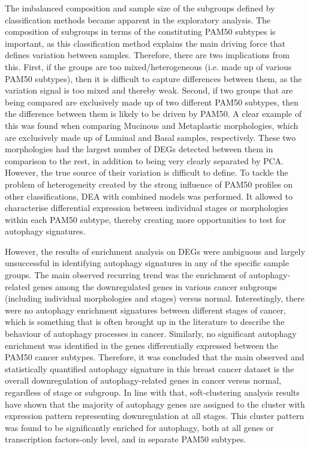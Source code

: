 The imbalanced composition and sample size of the subgroups defined by classification methods became apparent in the exploratory analysis. The composition of subgroups in terms of the constituting PAM50 subtypes is important, as this classification method explains the main driving force that defines variation between samples. Therefore, there are two implications from this. First, if the groups are too mixed/heterogeneous (i.e. made up of various PAM50 subtypes), then it is difficult to capture differences between them, as the variation signal is too mixed and thereby weak. Second, if two groups that are being compared are exclusively made up of two different PAM50 subtypes, then the difference between them is likely to be driven by PAM50. A clear example of this was found when comparing Mucinous and Metaplastic morphologies, which are exclusively made up of Luminal and Basal samples, respectively. These two morphologies had the largest number of DEGs detected between them in comparison to the rest, in addition to being very clearly separated by PCA. However,  the true source of their variation is difficult to define. 
To tackle the problem of heterogeneity created by the strong influence of PAM50 profiles on other classifications, DEA with combined models was performed. It allowed to characterise differential expression between individual stages or morphologies within each PAM50 subtype, thereby creating more opportunities to test for autophagy signatures.

However, the results of enrichment analysis on DEGs were ambiguous and largely unsuccessful in identifying autophagy signatures in any of the specific sample groups. The main observed recurring trend was the enrichment of autophagy-related genes among the downregulated genes in various cancer subgroups (including individual morphologies and stages) versus normal. Interestingly, there were no autophagy enrichment signatures between different stages of cancer, which is something that is often brought up in the literature to describe the behaviour of autophagy processes in cancer. Similarly, no significant autophagy enrichment was identified in the genes differentially expressed between the PAM50 cancer subtypes. Therefore, it was concluded that the main observed and statistically quantified autophagy signature in this breast cancer dataset is the overall downregulation of autophagy-related genes in cancer versus normal, regardless of stage or subgroup.
In line with that, soft-clustering analysis results have shown that the majority of autophagy genes are assigned to the cluster with expression pattern representing downregulation at all stages. This cluster pattern was found to be significantly enriched for autophagy, both at all genes or transcription factors-only level, and in separate PAM50 subtypes. 

